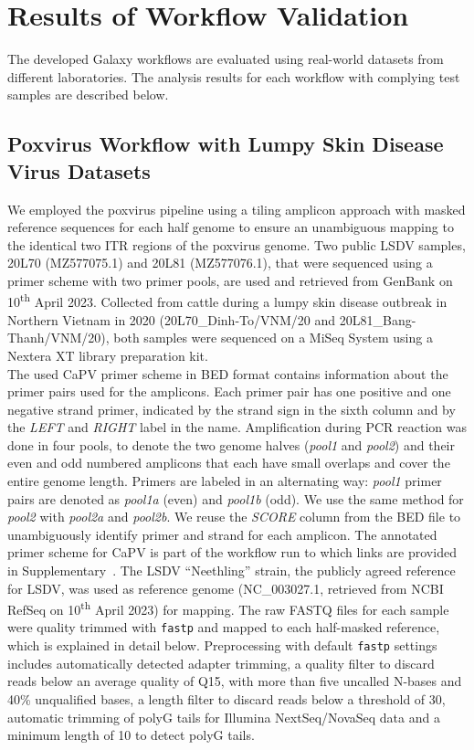 \chapter{Results of Workflow Validation}\label{chap:results}
The developed Galaxy workflows are evaluated using real-world datasets from different laboratories. The analysis results for each workflow with complying test samples are described below.

\section{Poxvirus Workflow with Lumpy Skin Disease Virus Datasets}
We employed the poxvirus pipeline using a tiling amplicon approach with masked reference sequences for each half genome to ensure an unambiguous mapping to the identical two \ac{ITR} regions of the poxvirus genome. Two public \ac{LSDV} samples, 20L70 (MZ577075.1) and 20L81 (MZ577076.1), that were sequenced using a primer scheme with two primer pools, are used and retrieved from GenBank on 10\textsuperscript{th} April 2023. Collected from cattle  during a lumpy skin disease outbreak in Northern Vietnam in 2020 (20L70\_Dinh-To/VNM/20 and 20L81\_Bang-Thanh/VNM/20), both samples were sequenced on a MiSeq System using a Nextera XT library preparation kit. \\
The used \acs{CaPV} primer scheme in \ac{BED} format contains information about the primer pairs used for the amplicons. Each primer pair has one positive and one negative strand primer, indicated by the strand sign in the sixth column and by the \textit{LEFT} and \textit{RIGHT} label in the name. Amplification during \ac{PCR} reaction was done in four pools, to denote the two genome halves (\textit{pool1} and \textit{pool2}) and their even and odd numbered amplicons that each have small overlaps and cover the entire genome length. Primers are labeled in an alternating way: \textit{pool1} primer pairs are denoted as \textit{pool1a} (even) and \textit{pool1b} (odd). We use the same method for \textit{pool2} with \textit{pool2a} and \textit{pool2b}. We reuse the \textit{SCORE} column from the \ac{BED} file to unambiguously identify primer and strand for each amplicon. The annotated primer scheme for \ac{CaPV} is part of the workflow run to which links are provided in Supplementary~. The \ac{LSDV} ``Neethling'' strain, the publicly agreed reference for \ac{LSDV}, was used as reference genome (NC\_003027.1, retrieved from \ac{NCBI} RefSeq on 10\textsuperscript{th} April 2023) for mapping. The raw FASTQ files for each sample were quality trimmed with \texttt{fastp} and mapped to each half-masked reference, which is explained in detail below. Preprocessing with default \texttt{fastp} settings includes automatically detected adapter trimming, a quality filter to discard reads below an average quality of Q15, with more than five uncalled N-bases and 40\% unqualified bases, a length filter to discard reads below a threshold of 30, automatic trimming of polyG tails for Illumina NextSeq/NovaSeq data and a minimum length of 10 to detect polyG tails.
\\

